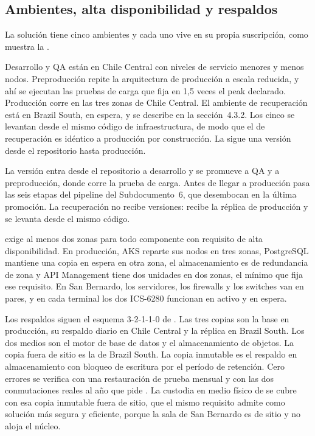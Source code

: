\subsection{Ambientes, alta disponibilidad y respaldos}\label{sec:4-ambientes}

La solución tiene cinco ambientes y cada uno vive en su propia suscripción, como muestra la
.


Desarrollo y QA están en Chile Central con niveles de servicio menores y menos nodos. Preproducción
repite la arquitectura de producción a escala reducida, y ahí se ejecutan las pruebas de carga que
 fija en 1,5 veces el peak declarado. Producción corre en las tres zonas de Chile
Central. El ambiente de recuperación está en Brazil South, en espera, y se describe en la
sección~4.3.2. Los cinco se levantan desde el mismo código de infraestructura, de modo que el de
recuperación es idéntico a producción por construcción. La  sigue una versión
desde el repositorio hasta producción.


La versión entra desde el repositorio a desarrollo y se promueve a QA y a preproducción, donde corre la
prueba de carga. Antes de llegar a producción pasa las seis etapas del pipeline del Subdocumento~6,
que desembocan en la última promoción. La recuperación no recibe versiones: recibe la réplica de
producción y se levanta desde el mismo código.

 exige al menos dos zonas para todo componente con requisito de alta
disponibilidad. En producción, AKS reparte sus nodos en tres zonas, PostgreSQL mantiene una copia en
espera en otra zona, el almacenamiento es de redundancia de zona y API Management tiene dos unidades en
dos zonas, el mínimo que fija ese requisito. En San Bernardo, los servidores, los firewalls y los switches van en pares, y en cada terminal los
dos ICS-6280 funcionan en activo y en espera.

Los respaldos siguen el esquema 3-2-1-1-0 de . Las tres copias son la base en
producción, su respaldo diario en Chile Central y la réplica en Brazil South. Los dos medios son el
motor de base de datos y el almacenamiento de objetos. La copia fuera de sitio es la de Brazil South.
La copia inmutable es el respaldo en almacenamiento con bloqueo de escritura por el período de
retención. Cero errores se verifica con una restauración de prueba mensual y con las dos conmutaciones
reales al año que pide . La custodia en medio físico de  se
cubre con esa copia inmutable fuera de sitio, que el mismo requisito admite como solución más segura y
eficiente, porque la sala de San Bernardo es de sitio y no aloja el núcleo.

